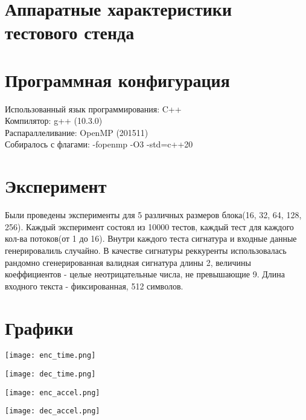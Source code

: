 \documentclass{article}
\begin{document}
\newpage
\section{Аппаратные характеристики тестового стенда}


\newpage
\section{Программная конфигурация}
Использованный язык программирования: C++\\
Компилятор: g++ (10.3.0)\\
Распараллеливание: OpenMP (201511)\\
Собиралось с флагами: -fopenmp -O3 -std=c++20

\newpage
\section{Эксперимент}
Были проведены эксперименты для 5 различных размеров блока(16, 32, 64, 128, 256).
Каждый эксперимент состоял из 10000 тестов, каждый тест для каждого кол-ва потоков(от 1 до 16).
Внутри каждого теста сигнатура и входные данные генерировалиль случайно.
В качестве сигнатуры реккуренты использовалась рандомно сгенерированная валидная сигнатура длины 2,
величины коеффициентов - целые неотрицательные числа, не превышающие 9.
Длина входного текста - фиксированная, 512 символов.

\newpage
\section{Графики}
\begin{minipage}{0.48\linewidth}
    \texttt{[image: enc\_time.png]}
\end{minipage}
\hfill
\begin{minipage}{0.49\linewidth}
    \texttt{[image: dec\_time.png]}
\end{minipage}

\begin{minipage}{0.48\linewidth}
    \texttt{[image: enc\_accel.png]}
\end{minipage}
\hfill
\begin{minipage}{0.48\linewidth}
    \texttt{[image: dec\_accel.png]}
\end{minipage}
\end{document}
